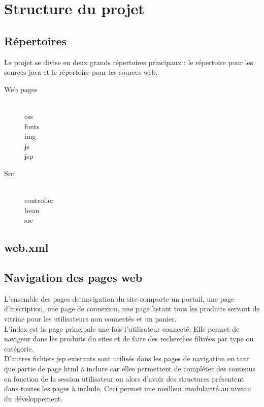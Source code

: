 \section{Structure du projet}

\subsection{Répertoires}

Le projet se divise en deux grands répertoires principaux : le répertoire pour 
les sources java et le répertoire pour les sources web.

\begin{description}
	\item[Web pages] \hfill \\
		css \\
		fonts \\
		img \\
		js \\
		jsp
	\item[Src] \hfill \\
		controller \\
		bean \\
		src
\end{description}

\subsection{web.xml}



\subsection{Navigation des pages web}

L'ensemble des pages de navigation du site comporte un portail, une page 
d'inscription, une page de connexion, une page listant tous les produits servant 
de vitrine pour les utilisateurs non connectés et un panier. \\

L'index est la page principale une fois l'utilisateur connecté. Elle permet de 
navigeur dans les produits du sites et de faire des recherches filtrées par 
type ou catégorie. \\

D'autres fichiers jsp existants sont utilisés dans les pages de navigation en 
tant que partie de page html à inclure car elles permettent de compléter des 
contenus en fonction de la session utilisateur ou alors d'avoir des structures 
présentent dans toutes les pages à include. Ceci permet une meilleur modularité 
au niveau du développement.
